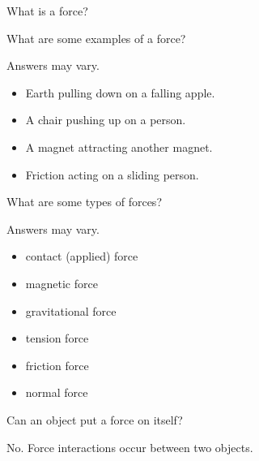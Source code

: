 \documentclass[]{exam}
\begin{document}
\begin{questions}

\question
What is a force?


\question
What are some examples of a force?

\begin{solution}
    Answers may vary.

    \begin{itemize}[itemsep=0pt]
        \item Earth pulling down on a falling apple. 
        \item A chair pushing up on a person.
        \item A magnet attracting another magnet.
        \item Friction acting on a sliding person.
    \end{itemize}
\end{solution}

\question
What are some types of forces?

\begin{solution}
    Answers may vary.

    \begin{itemize}[itemsep=0pt]
        \item contact (applied) force
        \item magnetic force
        \item gravitational force
        \item tension force
        \item friction force
        \item normal force
    \end{itemize}
\end{solution}

\question
Can an object put a force on itself? %

\begin{solution}
    No. Force interactions occur between two objects.
\end{solution}

\question
{}
\end{questions}
\end{document}
